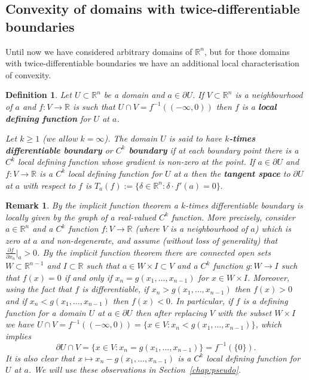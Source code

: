 \documentclass[11pt,a4paper, final, twoside]{article}
\newtheorem{definition}[theorem]{Definition}
\newtheorem{remark}[theorem]{Remark}
\numberwithin{equation}{section}
\newcommand{\R}{\mathbb R}
\newcommand{\pd}[2]{\frac{\partial #1}{\partial #2}}
\newcommand{\bd}{\partial}
\newcommand{\cts}{C}
\newcommand{\dprod}[2]{#1\cdot #2}
\newcommand{\grad}[1]{#1'}
\begin{document}
\subsection{Convexity of domains with twice-differentiable boundaries}
Until now we have considered arbitrary domains of $\R^n$, but for those domains with twice-differentiable boundaries we have an additional local characterisation of convexity.
\begin{definition}
Let $U\subset\R^n$ be a domain and $a\in\bd U$. If $V\subset\R^n$ is a neighbourhood of $a$ and $f\colon V\to\R$ is such that $U\cap V=f^{-1}((-\infty,0))$ then
$f$ is a \textbf{local defining function} for $U$ at $a$.


Let $k\geq 1$ (we allow $k=\infty$). The domain $U$ is said to have \textbf{$k$-times differentiable boundary} or \textbf{$\cts^k$ boundary} if at each boundary point there is a $\cts^k$ local defining function whose gradient is non-zero 
at the point.
If $a\in\bd U$ and $f\colon V\to\R$ is a $\cts^k$ local defining function for $U$ at $a$ then the \textbf{tangent space} to $\bd U$ at $a$ with respect to $f$ is
$ T_a(f):=\{\delta\in\R^n\colon \dprod{\delta}{\grad{f}(a)}=0\}.$
\end{definition}
\begin{remark}
\label{defrem}
By the implicit function theorem a $k$-times differentiable boundary is locally given by the graph of a real-valued $\cts^k$ function.
More precisely, consider $a\in\R^n$ and a $\cts^k$ function $f\colon V\to\R$ (where $V$ is a neighbourhood of $a$) which is zero at $a$ and non-degenerate,
and assume (without loss of generality) that $\pd{f}{x_n}\big|_a>0$. By the implicit function theorem there are connected open sets $W\subset\R^{n-1}$
and $I\subset\R$ such that $a\in W\times I\subset V$ and a $\cts^k$ function $g\colon W\to I$ such that $f(x)=0$ if and only if $x_n=g(x_1,\dots,x_{n-1})$
for $x\in W\times I$. Moreover, using the fact that $f$ is differentiable, if $x_n>g(x_1,\dots,x_{n-1})$ then $f(x)>0$ and if $x_n<g(x_1,\dots,x_{n-1})$ then $f(x)<0$.
In particular, if $f$ is a defining function for a domain $U$ at $a\in\bd U$ then after replacing $V$
with the subset $W\times I$ we have $U\cap V=f^{-1}((-\infty,0))=\{x\in V\colon x_n<g(x_1,\dots,x_{n-1})\}$, which implies
\begin{equation} \bd U\cap V=\{x\in V\colon x_n=g(x_1,\dots,x_{n-1})\}=f^{-1}(\{0\}).\label{defnais}\end{equation}
It is also clear that $x\mapsto x_n-g(x_1,\dots,x_{n-1})$ is a $\cts^k$ local defining function for $U$ at $a$.
We will use these observations in Section~\ref{chap:pseudo}.
\end{remark}
\end{document}
